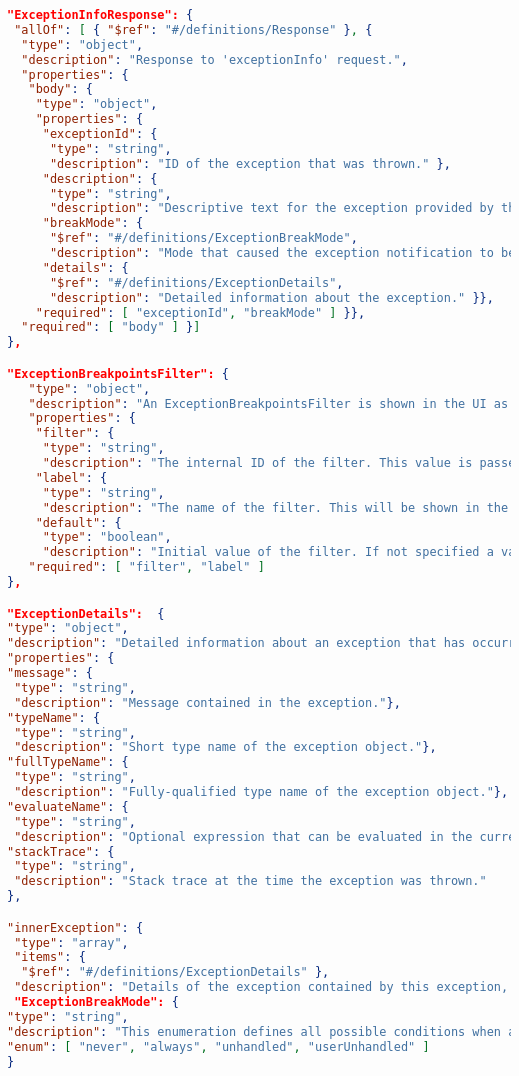 \documentclass[a4paper,12pt]{article}
\begin{document}
\begin{lstlisting}[language=json,title=\lstinline|Code fragment from debugProtocol.json|,firstnumber=1]
"ExceptionInfoResponse": {
 "allOf": [ { "$ref": "#/definitions/Response" }, {
  "type": "object",
  "description": "Response to 'exceptionInfo' request.",
  "properties": {
   "body": {
    "type": "object",
    "properties": {
     "exceptionId": {
      "type": "string",
      "description": "ID of the exception that was thrown." },
     "description": {
      "type": "string",
      "description": "Descriptive text for the exception provided by the debug adapter." },
     "breakMode": {
      "$ref": "#/definitions/ExceptionBreakMode",
      "description": "Mode that caused the exception notification to be raised." },
     "details": {
      "$ref": "#/definitions/ExceptionDetails",
      "description": "Detailed information about the exception." }},
    "required": [ "exceptionId", "breakMode" ] }},
  "required": [ "body" ] }] 
},

"ExceptionBreakpointsFilter": {
   "type": "object",
   "description": "An ExceptionBreakpointsFilter is shown in the UI as an option for configuring how exceptions are dealt with.",
   "properties": {
    "filter": {
     "type": "string",
     "description": "The internal ID of the filter. This value is passed to the setExceptionBreakpoints request."},
    "label": {
     "type": "string",
     "description": "The name of the filter. This will be shown in the UI." },
    "default": {
     "type": "boolean",
     "description": "Initial value of the filter. If not specified a value 'false' is assumed."  } },
   "required": [ "filter", "label" ] 
},

"ExceptionDetails":  {
"type": "object",
"description": "Detailed information about an exception that has occurred.",
"properties": {
"message": {
 "type": "string",
 "description": "Message contained in the exception."},
"typeName": {
 "type": "string",
 "description": "Short type name of the exception object."},
"fullTypeName": {
 "type": "string",
 "description": "Fully-qualified type name of the exception object."},
"evaluateName": {
 "type": "string",
 "description": "Optional expression that can be evaluated in the current scope to obtain the exception object."},
"stackTrace": {
 "type": "string",
 "description": "Stack trace at the time the exception was thrown."
},

"innerException": {
 "type": "array",
 "items": {
  "$ref": "#/definitions/ExceptionDetails" },
 "description": "Details of the exception contained by this exception, if any."}}},
 "ExceptionBreakMode": {
"type": "string",
"description": "This enumeration defines all possible conditions when a thrown exception should result in a break.\nnever: never breaks,\nalways: always breaks,\nunhandled: breaks when excpetion unhandled,\nuserUnhandled: breaks if the exception is not handled by user code.",
"enum": [ "never", "always", "unhandled", "userUnhandled" ]
}
\end{lstlisting}
\end{document}
